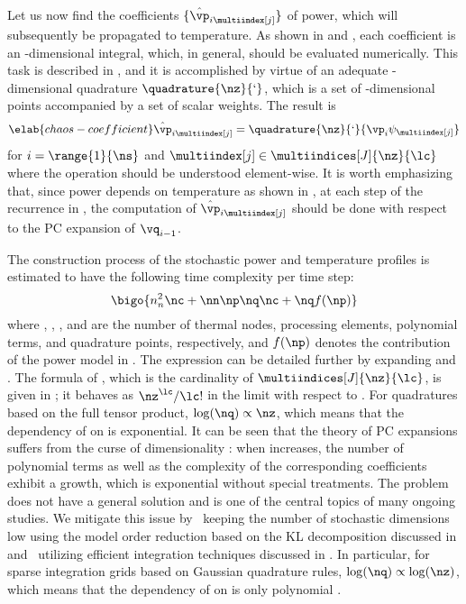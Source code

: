 Let us now find the coefficients $\{ \hat{\vp}_{i \multiindex[j]} \}$ of power,
which will subsequently be propagated to temperature. As shown in
 and , each coefficient is an
\nz-dimensional integral, which, in general, should be evaluated numerically.
This task is described in , and it is accomplished
by virtue of an adequate \nz-dimensional quadrature $\quadrature{\nz}{\lq}$,
which is a set of \nz-dimensional points accompanied by a set of scalar weights.
The result is
\begin{equation} \elab{chaos-coefficient}
  \hat{\vp}_{i \multiindex[j]} = \quadrature{\nz}{\lq}{\vp_i \psi_{\multiindex[j]}}
\end{equation}
for $i = \range{1}{\ns}$ and $\multiindex[j] \in \multiindices[J]{\nz}{\lc}$
where the operation should be understood element-wise. It is worth emphasizing
that, since power depends on temperature as shown in , at each
step of the recurrence in , the computation of
$\hat{\vp}_{i \multiindex[j]}$ should be done with respect to the \ac{PC}
expansion of $\vq_{i - 1}$.

The construction process of the stochastic power and temperature profiles is
estimated to have the following time complexity per time step:
\[
  \bigo{n_n^2 \nc + \nn \np \nq \nc + \nq f(\np)}
\]
where \nn, \np, \nc, and \nq are the number of thermal nodes, processing
elements, polynomial terms, and quadrature points, respectively, and $f(\np)$
denotes the contribution of the power model in . The
expression can be detailed further by expanding \nc and \nq. The formula of \nc,
which is the cardinality of $\multiindices[J]{\nz}{\lc}$, is given in
; it behaves as $\nz^\lc / \lc!$ in the
limit with respect to \nz. For quadratures based on the full tensor product,
$\log(\nq) \propto \nz$, which means that the dependency of \nq on \nz is
exponential. It can be seen that the theory of \ac{PC} expansions suffers from
the curse of dimensionality \cite{eldred2008, xiu2010}: when \nz increases, the
number of polynomial terms as well as the complexity of the corresponding
coefficients exhibit a growth, which is exponential without special treatments.
The problem does not have a general solution and is one of the central topics of
many ongoing studies. We mitigate this issue by \one~keeping the number of
stochastic dimensions low using the model order reduction based on the \ac{KL}
decomposition discussed in  and \two~utilizing
efficient integration techniques discussed in . In
particular, for sparse integration grids based on Gaussian quadrature rules,
$\log(\nq) \propto \log(\nz)$, which means that the dependency of \nq on \nz is
only polynomial \cite{heiss2008}.

